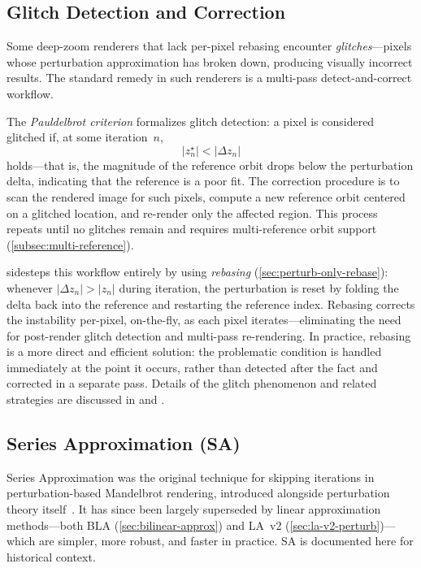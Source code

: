 \subsection{Glitch Detection and Correction}
\label{subsec:glitch-detection}

Some deep-zoom renderers that lack per-pixel rebasing encounter
\emph{glitches}---pixels whose perturbation approximation has broken
down, producing visually incorrect results.  The standard remedy in
such renderers is a multi-pass detect-and-correct workflow.

The \emph{Pauldelbrot criterion} formalizes glitch detection: a pixel is
considered glitched if, at some iteration~$n$,
\begin{equation}
  |z_n^\star| < |\Delta z_n|
  \label{eq:pauldelbrot-criterion}
\end{equation}
holds---that is, the magnitude of the reference orbit drops below the
perturbation delta, indicating that the reference is a poor fit.  The
correction procedure is to scan the rendered image for such pixels,
compute a new reference orbit centered on a glitched location, and
re-render only the affected region.  This process repeats until no
glitches remain and requires multi-reference orbit support
(\cref{subsec:multi-reference}).

\FractalShark{} sidesteps this workflow entirely by using
\emph{rebasing} (\cref{sec:perturb-only-rebase}): whenever
$|\Delta z_n| > |z_n|$ during iteration, the perturbation is reset by
folding the delta back into the reference and restarting the reference
index.  Rebasing corrects the instability per-pixel, on-the-fly, as
each pixel iterates---eliminating the need for post-render glitch
detection and multi-pass re-rendering.  In practice, rebasing is a more
direct and efficient solution: the problematic condition is handled
immediately at the point it occurs, rather than detected after the fact
and corrected in a separate pass.  Details of the glitch phenomenon and
related strategies are discussed in
\cite{HeilandAllen2013Perturbation} and \cite{HeilandAllen2022DeepZoom}.

\subsection{Series Approximation (SA)}
\label{subsec:series-approx}

Series Approximation was the original technique for skipping iterations
in perturbation-based Mandelbrot rendering, introduced alongside
perturbation theory itself~\cite{Martin2013Perturbation}.  It has since
been largely superseded by linear approximation methods---both BLA
(\cref{sec:bilinear-approx}) and LA~v2
(\cref{sec:la-v2-perturb})---which are simpler, more robust, and faster
in practice.  SA is documented here for historical context.

